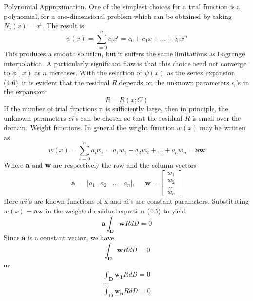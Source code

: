 Polynomial Approximation. One of the simplest choices for a trial function is a polynomial, for a one-dimensional problem which can be obtained by taking $N_i(x) = x^i$. The result is
\begin{equation}
\psi(x)= \sum_{i=0}^nc_ix^i=c_0+c_1x+...+c_nx^n
\end{equation}
This produces a smooth solution, but it suffers the same limitations as Lagrange interpolation. A particularly significant flaw is that this choice need not converge to $\phi(x)$ as $n$ increases.
With the selection of $\psi(x)$ as the series expansion (4.6), it is evident that the residual $R$ depends on the unknown parameters $c_i$’s in the expansion:
\begin{equation}
R=R(x;C)
\end{equation}
If the number of trial functions n is sufficiently large, then in principle, the unknown parameters $ci$’s can be chosen so that the residual $R$ is small over the domain.
Weight functions. In general the weight function $w(x)$ may be written as
\begin{equation}
w(x)= \sum_{i=0}^na_iw_i=a_1w_1+a_2w_2+...+a_nw_n=\boldsymbol{aw}
\end{equation}
Where \textbf{a} and \textbf{w} are respectively the row  and the column vectors
\begin{equation}
\boldsymbol{a}=
\begin{matrix}
[ a_1	& a_2 & ... & a_n ],
\end{matrix} 
\quad 
\boldsymbol{w}=\left[
\begin{matrix}
w _1	\\ w_2 \\ ... \\ w_n 
\end{matrix} \right]
\end{equation}
Here $wi$’s are known functions of x and ai’s are constant parameters. Substituting $w(x) = \boldsymbol{aw}$ in
the weighted residual equation (4.5) to yield
\begin{equation}
\boldsymbol{a\int_Dw}RdD=0
\end{equation}
Since \textbf{a} is a constant vector, we have
\begin{equation}
\boldsymbol{\int_Dw}RdD=0
\end{equation}or
\begin{align}
\boldsymbol{\int_Dw_1}RdD=0\\
...\\
\boldsymbol{\int_Dw_n}RdD=0
\end{align}
